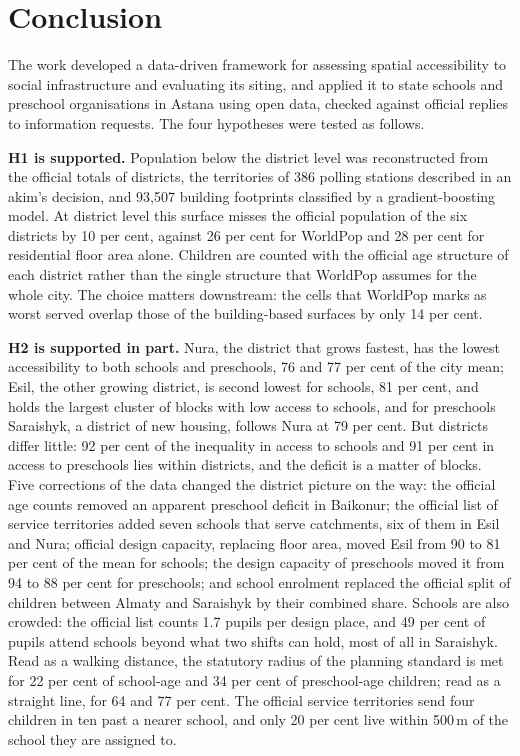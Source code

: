 \chapter*{Conclusion}

The work developed a data-driven framework for assessing spatial accessibility to social infrastructure and evaluating its siting, and applied it to state schools and preschool organisations in Astana using open data, checked against official replies to information requests. The four hypotheses were tested as follows.

\textbf{H1 is supported.} Population below the district level was reconstructed from the official totals of districts, the territories of 386 polling stations described in an akim's decision, and 93,507 building footprints classified by a gradient-boosting model. At district level this surface misses the official population of the six districts by 10 per cent, against 26 per cent for WorldPop and 28 per cent for residential floor area alone. Children are counted with the official age structure of each district rather than the single structure that WorldPop assumes for the whole city. The choice matters downstream: the cells that WorldPop marks as worst served overlap those of the building-based surfaces by only 14 per cent.

\textbf{H2 is supported in part.} Nura, the district that grows fastest, has the lowest accessibility to both schools and preschools, 76 and 77 per cent of the city mean; Esil, the other growing district, is second lowest for schools, 81 per cent, and holds the largest cluster of blocks with low access to schools, and for preschools Saraishyk, a district of new housing, follows Nura at 79 per cent. But districts differ little: 92 per cent of the inequality in access to schools and 91 per cent in access to preschools lies within districts, and the deficit is a matter of blocks. Five corrections of the data changed the district picture on the way: the official age counts removed an apparent preschool deficit in Baikonur; the official list of service territories added seven schools that serve catchments, six of them in Esil and Nura; official design capacity, replacing floor area, moved Esil from 90 to 81 per cent of the mean for schools; the design capacity of preschools moved it from 94 to 88 per cent for preschools; and school enrolment replaced the official split of children between Almaty and Saraishyk by their combined share. Schools are also crowded: the official list counts 1.7 pupils per design place, and 49 per cent of pupils attend schools beyond what two shifts can hold, most of all in Saraishyk. Read as a walking distance, the statutory radius of the planning standard is met for 22 per cent of school-age and 34 per cent of preschool-age children; read as a straight line, for 64 and 77 per cent. The official service territories send four children in ten past a nearer school, and only 20 per cent live within 500\,m of the school they are assigned to.

